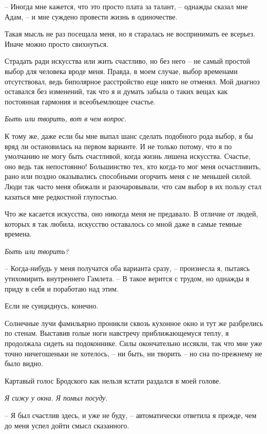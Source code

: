 \documentclass[
]{book}
\begin{document}
-- Иногда мне кажется, что это просто плата за талант, -- однажды сказал мне Адам, -- и мне суждено провести жизнь в одиночестве.

Такая мысль не раз посещала меня, но я старалась не воспринимать ее всерьез. Иначе можно просто свихнуться.

Страдать ради искусства или жить счастливо, но без него -- не самый простой выбор для человека вроде меня. Правда, в моем случае, выбор временами отсутствовал, ведь биполярное расстройство еще никто не отменял. Мой диагноз оставался без изменений, так что я и думать забыла о таких вещах как постоянная гармония и всеобъемлющее счастье.

\emph{Быть или творить, вот в чем вопрос.}

К тому же, даже если бы мне выпал шанс сделать подобного рода выбор, я бы вряд ли остановилась на первом варианте. И не только потому, что я по умолчанию не могу быть счастливой, когда жизнь лишена искусства. Счастье, оно ведь так непостоянно! Большинство тех, кто когда-то мог меня осчастливить, рано или поздно оказывались способными огорчить меня с не меньшей силой. Люди так часто меня обижали и разочаровывали, что сам выбор в их пользу стал казаться мне редкостной глупостью.

Что же касается искусства, оно никогда меня не предавало. В отличие от людей, которых я так любила, искусство оставалось со мной даже в самые темные времена.

\emph{Быть или творить?}

-- Когда-нибудь у меня получатся оба варианта сразу, -- произнесла я, пытаясь утихомирить внутреннего Гамлета. -- В такое верится с трудом, но однажды я приду в себя и поработаю над этим.

Если не суициднусь, конечно.

Солнечные лучи фамильярно проникли сквозь кухонное окно и тут же разбрелись по стенам. Выставив голые ноги навстречу приближающемуся теплу, я продолжала сидеть на подоконнике. Силы окончательно иссякли, так что мне уже точно ничегошеньки не хотелось, -- ни быть, ни творить -- но сна по-прежнему не было видно.

Картавый голос Бродского как нельзя кстати раздался в моей голове.

\emph{Я сижу у окна. Я помыл посуду.}

-- Я был счастлив здесь, и уже не буду, -- автоматически ответила я прежде, чем до меня успел дойти смысл сказанного.

\hypertarget{chapter-60}{%
\chapter{~}\label{chapter-60}}
\end{document}
